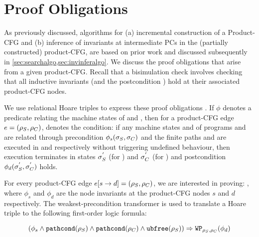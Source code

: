 \section{Proof Obligations}
\label{sec:proofobl}
As previously discussed, algorithms for (a) incremental construction of a Product-CFG
and (b) inference of invariants at intermediate PCs in the (partially constructed) product-CFG, are
based on prior work\cite{shubhanipdhthesis} and discussed subsequently in \cref{sec:searchalgo,sec:invinferalgo}.
We discuss the proof obligations that arise from a given product-CFG.
Recall that a bisimulation check involves checking that all inductive invariants
(and the postcondition \post{}) hold at their associated product-CFG nodes.

We use relational Hoare triples to express these proof obligations \cite{relationalHoareLogic,hoareTriple}.
If $\phi$ denotes a predicate relating the machine states of \sprog{} and \cprog{}, then
for a product-CFG edge $e=({\tt \rho}_{S},{\tt \rho}_{C})$, 
denotes the condition:
if any machine states \sv{\sigma} and \cv{\sigma} of programs \sprog{} and \cprog{} are related through
precondition $\phi_s({\tt \sigma}_{S},{\tt \sigma}_{C})$ and the finite paths \sv{\rho} and \cv{\rho}
are executed in \sprog{} and \cprog{} respectively without triggering undefined behaviour,
then execution terminates in states ${\tt \sigma}_{S}^{'}$ (for \sprog{}) and
${\tt \sigma}_{C}^{'}$ (for \cprog{}) and postcondition $\phi_d({\tt \sigma}_{S}^{'},{\tt \sigma}_{C}^{'})$ holds.

For every product-CFG edge $e[s \rightarrow d] = ({\tt \rho}_{S}, {\tt \rho}_{C})$,
we are interested in proving: ,
where $\phi_s$ and $\phi_d$ are the node invariants at the product-CFG nodes $s$ and $d$
respectively.
The weakest-precondition transformer is used to translate a Hoare triple
 to the following
first-order logic formula:

\begin{equation}
\label{eqn:firstOrderFormula}
(\phi_s \land {\ensuremath{{\tt pathcond}({\tt \rho}_{S})}} \land {\ensuremath{{\tt pathcond}({\tt \rho}_{C})}} \land {\ensuremath{{\tt ubfree}({\tt \rho}_{S})}}) \Rightarrow {\tt WP}_{{{\tt \rho}_{S},{\tt \rho}_{C}}}(\phi_d)
\end{equation}

